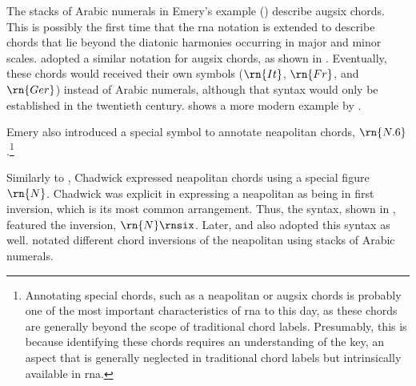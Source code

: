 


The stacks of Arabic numerals in Emery's example
() describe
\gls{augsix} chords. This is possibly the first time that
the \gls{rna} notation is extended to describe chords that
lie beyond the diatonic harmonies occurring in major and
minor scales. \textcite{shepard1896harmony} adopted a
similar notation for \gls{augsix} chords, as shown in
. Eventually,
these chords would received their own symbols ($\rn{It}$,
$\rn{Fr}$, and $\rn{Ger}$) instead of Arabic numerals,
although that syntax would only be established in the
twentieth century.
 shows a more
modern example by \textcite{goldman1965harmony}.



Emery also introduced a special symbol to annotate
\gls{neapolitan} chords, $\rn{N.6}$.\footnote{Annotating
special chords, such as a \gls{neapolitan} or \gls{augsix}
chords is probably one of the most important characteristics
of \gls{rna} to this day, as these chords are generally
beyond the scope of traditional chord labels. Presumably,
this is because identifying these chords requires an
understanding of the key, an aspect that is generally
neglected in traditional chord labels but intrinsically
available in \gls{rna}.}

Similarly to \textcite{emery1879elements}, Chadwick
expressed \gls{neapolitan} chords using a special figure
$\rn{N}$. Chadwick was explicit in expressing a
\gls{neapolitan} as being in first inversion, which is its
most common arrangement. Thus, the syntax, shown in
, featured
the inversion, $\rn{N}\rnsix$. Later,
\textcite{heacox1907lessons} and
\textcite{alchin1921applied} also adopted this syntax as
well. \textcite{heacox1907lessons} notated different chord
inversions of the \gls{neapolitan} using stacks of Arabic
numerals.


